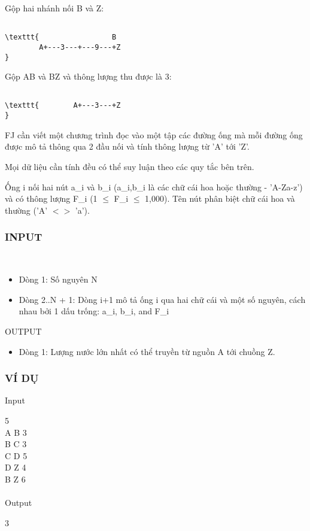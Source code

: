 Gộp hai nhánh nối B và Z:
\begin{verbatim}

\texttt{                 B
        A+---3---+---9---+Z
}\end{verbatim}

Gộp AB và BZ và thông lượng thu được là 3:
\begin{verbatim}

\texttt{        A+---3---+Z
}\end{verbatim}

FJ cần viết một chương trình đọc vào một tập các đường ống mà mỗi đường ống được mô tả thông qua 2 đầu nối và tính thông lượng từ 'A' tới 'Z'.

Mọi dữ liệu cần tính đều có thể suy luận theo các quy tắc bên trên.

Ống i nối hai nút a\_i và b\_i (a\_i,b\_i là các chữ cái hoa hoặc thường - 'A-Za-z') và có thông lượng F\_i (1  $\le$  F\_i  $\le$  1,000). Tên nút phân biệt chữ cái hoa và thường ('A' $<$$>$ 'a').

\subsubsection{INPUT}

 
\begin{itemize}
	\item Dòng 1: Số nguyên N
	\item Dòng 2..N + 1: Dòng i+1 mô tả ống i qua hai chữ cái và một số nguyên, cách nhau bởi 1 dấu trống: a\_i, b\_i, and F\_i
\end{itemize}

OUTPUT
\begin{itemize}
	\item Dòng 1: Lượng nước lớn nhất có thể truyền từ nguồn A tới chuồng Z.
\end{itemize}

\subsubsection{VÍ DỤ}

Input

5
\\A B 3
\\B C 3
\\C D 5
\\D Z 4
\\B Z 6
\\
\\Output

3
